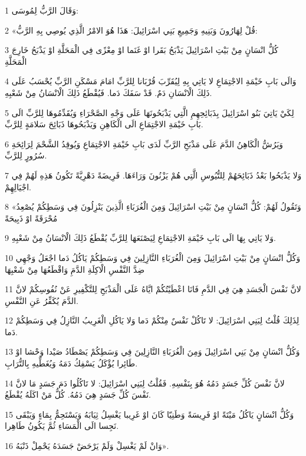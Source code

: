 \par 1 وَقَالَ الرَّبُّ لِمُوسَى:
\par 2 «قُلْ لِهَارُونَ وَبَنِيهِ وَجَمِيعِ بَنِي اسْرَائِيلَ: هَذَا هُوَ الامْرُ الَّذِي يُوصِي بِهِ الرَّبُّ:
\par 3 كُلُّ انْسَانٍ مِنْ بَيْتِ اسْرَائِيلَ يَذْبَحُ بَقَرا اوْ غَنَما اوْ مِعْزًى فِي الْمَحَلَّةِ اوْ يَذْبَحُ خَارِجَ الْمَحَلَّةِ
\par 4 وَالَى بَابِ خَيْمَةِ الاجْتِمَاعِ لا يَاتِي بِهِ لِيُقَرِّبَ قُرْبَانا لِلرَّبِّ امَامَ مَسْكَنِ الرَّبِّ يُحْسَبُ عَلَى ذَلِكَ الْانْسَانِ دَمٌ. قَدْ سَفَكَ دَما. فَيُقْطَعُ ذَلِكَ الْانْسَانُ مِنْ شَعْبِهِ.
\par 5 لِكَيْ يَاتِيَ بَنُو اسْرَائِيلَ بِذَبَائِحِهِمِ الَّتِي يَذْبَحُونَهَا عَلَى وَجْهِ الصَّحْرَاءِ وَيُقَدِّمُوهَا لِلرَّبِّ الَى بَابِ خَيْمَةِ الاجْتِمَاعِ الَى الْكَاهِنِ وَيَذْبَحُوهَا ذَبَائِحَ سَلامَةٍ لِلرَّبِّ.
\par 6 وَيَرُشُّ الْكَاهِنُ الدَّمَ عَلَى مَذْبَحِ الرَّبِّ لَدَى بَابِ خَيْمَةِ الاجْتِمَاعِ وَيُوقِدُ الشَّحْمَ لِرَائِحَةِ سُرُورٍ لِلرَّبِّ.
\par 7 وَلا يَذْبَحُوا بَعْدُ ذَبَائِحَهُمْ لِلتُّيُوسِ الَّتِي هُمْ يَزْنُونَ وَرَاءَهَا. فَرِيضَةً دَهْرِيَّةً تَكُونُ هَذِهِ لَهُمْ فِي اجْيَالِهِمْ.
\par 8 «وَتَقُولُ لَهُمْ: كُلُّ انْسَانٍ مِنْ بَيْتِ اسْرَائِيلَ وَمِنَ الْغُرَبَاءِ الَّذِينَ يَنْزِلُونَ فِي وَسَطِكُمْ يُصْعِدُ مُحْرَقَةً اوْ ذَبِيحَةً
\par 9 وَلا يَاتِي بِهَا الَى بَابِ خَيْمَةِ الاجْتِمَاعِ لِيَصْنَعَهَا لِلرَّبِّ يُقْطَعُ ذَلِكَ الْانْسَانُ مِنْ شَعْبِهِ.
\par 10 وَكُلُّ انْسَانٍ مِنْ بَيْتِ اسْرَائِيلَ وَمِنَ الْغُرَبَاءِ النَّازِلِينَ فِي وَسَطِكُمْ يَاكُلُ دَما اجْعَلُ وَجْهِي ضِدَّ النَّفْسِ الْاكِلَةِ الدَّمَِ وَاقْطَعُهَا مِنْ شَعْبِهَا
\par 11 لانَّ نَفْسَ الْجَسَدِ هِيَ فِي الدَّمِ فَانَا اعْطَيْتُكُمْ ايَّاهُ عَلَى الْمَذْبَحِ لِلتَّكْفِيرِ عَنْ نُفُوسِكُمْ لانَّ الدَّمَ يُكَفِّرُ عَنِ النَّفْسِ.
\par 12 لِذَلِكَ قُلْتُ لِبَنِي اسْرَائِيلَ: لا تَاكُلْ نَفْسٌ مِنْكُمْ دَما وَلا يَاكُلِ الْغَرِيبُ النَّازِلُ فِي وَسَطِكُمْ دَما.
\par 13 وَكُلُّ انْسَانٍ مِنْ بَنِي اسْرَائِيلَ وَمِنَ الْغُرَبَاءِ النَّازِلِينَ فِي وَسَطِكُمْ يَصْطَادُ صَيْدا وَحْشا اوْ طَائِرا يُؤْكَلُ يَسْفِكُ دَمَهُ وَيُغَطِّيهِ بِالتُّرَابِ.
\par 14 لانَّ نَفْسَ كُلِّ جَسَدٍ دَمُهُ هُوَ بِنَفْسِهِ. فَقُلْتُ لِبَنِي اسْرَائِيلَ: لا تَاكُلُوا دَمَ جَسَدٍ مَا لانَّ نَفْسَ كُلِّ جَسَدٍ هِيَ دَمُهُ. كُلُّ مَنْ اكَلَهُ يُقْطَعُ.
\par 15 وَكُلُّ انْسَانٍ يَاكُلُ مَيْتَةً اوْ فَرِيسَةً وَطَنِيّا كَانَ اوْ غَرِيبا يَغْسِلُ ثِيَابَهُ وَيَسْتَحِمُّ بِمَاءٍ وَيَبْقَى نَجِسا الَى الْمَسَاءِ ثُمَّ يَكُونُ طَاهِرا.
\par 16 وَانْ لَمْ يَغْسِلْ وَلَمْ يَرْحَضْ جَسَدَهُ يَحْمِلْ ذَنْبَهُ».

